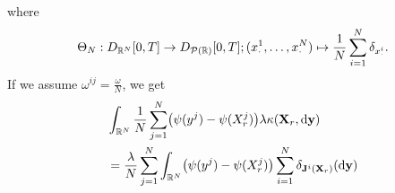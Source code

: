 \documentclass{article}
\begin{document}
where
\begin{equation}
  \Theta_N : D_{\mathbb{R}^N}[0,T] \to D_{\mathcal{P}(\mathbb{R})}[0,T]; (x_\cdot^1,\dots,x_\cdot^N) \mapsto \frac{1}{N} \sum_{i=1}^N \delta_{x_\cdot^i}.
\end{equation}
If we assume $\omega^{ij} = \frac{\omega}{N}$, we get
\begin{equation}\label{eq:kappa-to-mean-kappa}
  \begin{split}
     & \int_{\potspace^N} \frac{1}{N} \sum_{j=1}^N \br*{ \psi(y^j) - \psi(X_{r}^j) } \lambda \kappa(\bm{X}_r, \odif{\bm{y}})                                                                  \\
     & = \frac{\lambda}{N} \sum_{j=1}^N \int_{\potspace^N} \br*{ \psi(y^j) - \psi(X_{r}^j) } \sum_{i=1}^N \delta_{\bm{\jtarg}^i(\bm{X}_r)}(\odif{\bm{y}})                                     \\

\end{split}
\end{equation}
\end{document}
